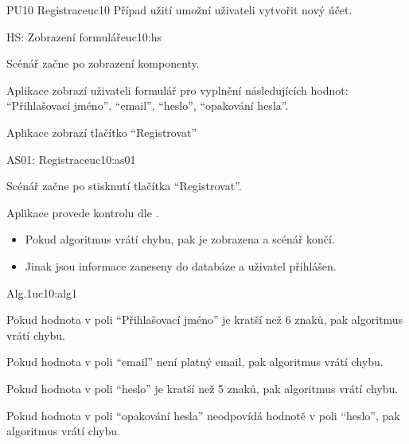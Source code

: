 \begin{usecase}{PU10 Registrace}{uc10}
    Případ užití umožní uživateli vytvořit nový účet.

    \begin{scenario}{HS: Zobrazení formuláře}{uc10:hs}
        \item Scénář začne po zobrazení komponenty.
        \item Aplikace zobrazí uživateli formulář pro vyplnění následujících hodnot: \enquote{Přihlašovací jméno}, \enquote{email}, \enquote{heslo}, \enquote{opakování hesla}.
        \item Aplikace zobrazí tlačítko \enquote{Registrovat}
    \end{scenario}

    \begin{scenario}{AS01: Registrace}{uc10:as01}
        \item Scénář začne po stisknutí tlačítka \enquote{Registrovat}.
        \item Aplikace provede kontrolu dle .
        \begin{itemize}
            \item Pokud algoritmus vrátí chybu, pak je zobrazena a scénář končí.
            \item Jinak jsou informace zaneseny do databáze a uživatel přihlášen.
        \end{itemize}
    \end{scenario}
    
    \begin{scenario}{Alg.1}{uc10:alg1}
        \item Pokud hodnota v poli \enquote{Přihlašovací jméno} je kratší než 6 znaků, pak algoritmus vrátí chybu.
        \item Pokud hodnota v poli \enquote{email} není platný email, pak algoritmus vrátí chybu.
        \item Pokud hodnota v poli \enquote{heslo} je kratší než 5 znaků, pak algoritmus vrátí chybu.
        \item Pokud hodnota v poli \enquote{opakování hesla} neodpovídá hodnotě v poli \enquote{heslo}, pak algoritmus vrátí chybu.
    \end{scenario}
\end{usecase}